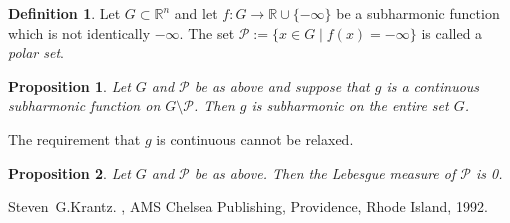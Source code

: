 \documentclass[12pt]{article}
\theoremstyle{theorem}
\newtheorem*{prop}{Proposition}
\theoremstyle{definition}
\newtheorem*{defn}{Definition}
\begin{document}
\begin{defn}
Let $G \subset {\mathbb{R}}^n$ and let
$f \colon G \to {\mathbb{R}} \cup \{ - \infty \}$ be a subharmonic
function which is not identically $-\infty$.
The set ${\mathcal{P}} := \{ x \in G \mid f(x) = - \infty \}$ is
called a {\em polar set}.
\end{defn}

\begin{prop}
Let $G$ and ${\mathcal{P}}$ be as above and suppose that $g$ is a
continuous
subharmonic function on $G \setminus {\mathcal{P}}$.  Then $g$ is subharmonic
on the entire set $G$.
\end{prop}

The requirement that $g$ is continuous cannot be relaxed.

\begin{prop}
Let $G$ and ${\mathcal{P}}$ be as above.  Then the Lebesgue measure of
${\mathcal{P}}$ is 0.
\end{prop}

\begin{thebibliography}{9}
Steven~G.\@ Krantz.
{\em {}},
AMS Chelsea Publishing, Providence, Rhode Island, 1992.
\end{thebibliography}
\end{document}

